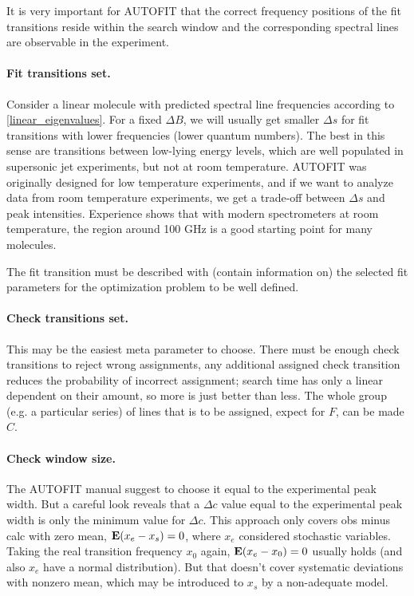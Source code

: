 \documentclass[11pt]{article}
\begin{document}
It is very important for AUTOFIT that the correct frequency positions of the fit transitions reside within the search window and the corresponding spectral lines are observable in the experiment.

\paragraph{Fit transitions set.}

Consider a linear molecule with predicted spectral line frequencies according to \ref{linear_eigenvalues}. For a fixed $\Delta B$, we will usually get smaller $\Delta s$ for fit transitions with lower frequencies (lower quantum numbers). The best in this sense are transitions between low-lying energy levels, which are well populated in supersonic jet experiments, but not at room temperature. AUTOFIT was originally designed for low temperature experiments, and if we want to analyze data from room temperature experiments, we get a trade-off between $\Delta s$ and peak intensities. Experience shows that with modern spectrometers at room temperature, the region around 100 GHz is a good starting point for many molecules.

The fit transition must be described with (contain information on) the selected fit parameters for the optimization problem to be well defined.

\paragraph{Check transitions set.}

This may be the easiest meta  parameter to choose. There must be enough check transitions to reject wrong assignments, any additional assigned check transition reduces the probability of incorrect assignment; search time has only a linear dependent on their amount, so more is just better than less. The whole group (e.g. a particular series) of lines that is to be assigned, expect for $F$, can be made $C$.

\paragraph{Check window size.}

The AUTOFIT manual suggest to choose it equal to the experimental peak width. But a careful look reveals that a $\Delta c$ value equal to the experimental peak width is only the minimum value for $\Delta c$. This approach only covers obs minus calc  with zero mean, $\mathbf{E} (x_e - x_s) = 0$, where $x_e$ considered stochastic variables. Taking the real transition frequency $x_0$ again, $\mathbf{E} (x_e - x_0) = 0$ usually holds (and also $x_e$ have a normal distribution). But that doesn't cover systematic deviations with nonzero mean, which may be introduced to $x_s$ by a non-adequate model.
\end{document}
